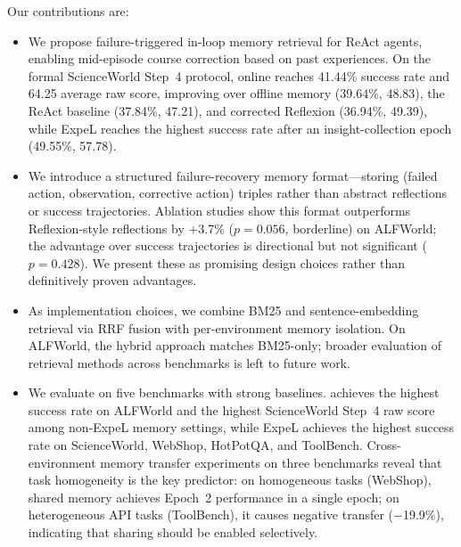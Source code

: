 Our contributions are:
\begin{itemize}
    \item We propose failure-triggered in-loop memory retrieval for ReAct agents, enabling mid-episode course correction based on past experiences. On the formal ScienceWorld Step~4 protocol, online \method{} reaches 41.44\% success rate and 64.25 average raw score, improving over offline memory (39.64\%, 48.83), the ReAct baseline (37.84\%, 47.21), and corrected Reflexion (36.94\%, 49.39), while ExpeL reaches the highest success rate after an insight-collection epoch (49.55\%, 57.78).
    \item We introduce a structured failure-recovery memory format---storing (failed action, observation, corrective action) triples rather than abstract reflections or success trajectories. Ablation studies show this format outperforms Reflexion-style reflections by +3.7\% ($p{=}0.056$, borderline) on ALFWorld; the advantage over success trajectories is directional but not significant ($p{=}0.428$). We present these as promising design choices rather than definitively proven advantages.
    \item As implementation choices, we combine BM25 and sentence-embedding retrieval via RRF fusion with per-environment memory isolation. On ALFWorld, the hybrid approach matches BM25-only; broader evaluation of retrieval methods across benchmarks is left to future work.
    \item We evaluate on five benchmarks with strong baselines. \method{} achieves the highest success rate on ALFWorld and the highest ScienceWorld Step~4 raw score among non-ExpeL memory settings, while ExpeL achieves the highest success rate on ScienceWorld, WebShop, HotPotQA, and ToolBench. Cross-environment memory transfer experiments on three benchmarks reveal that task homogeneity is the key predictor: on homogeneous tasks (WebShop), shared memory achieves Epoch~2 performance in a single epoch; on heterogeneous API tasks (ToolBench), it causes negative transfer ($-$19.9\%), indicating that sharing should be enabled selectively.
\end{itemize}
